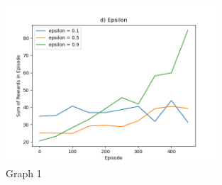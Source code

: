 \documentclass{article}
\begin{document}
\begin{figure}[h!]
    \centering
    \includegraphics[width=0.7\textwidth]{graph d.png}
    \caption{Graph 1}
\end{figure}
\end{document}
